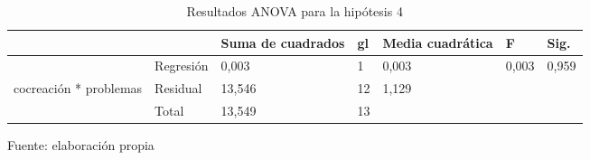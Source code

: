 \begin{table}[h]
    \caption {Resultados ANOVA para la hipótesis 4}
	\label{tab:anovaH4}
	\setlength\extrarowheight{5pt}
	
	\begin{tabular}{p{2.1cm} p{3.1cm} p{1.8cm} p{0.9cm} p{1.8cm} p{0.9cm} p{2.0cm}}
	\toprule
			&						& Suma de cuadrados	& gl	& Media cuadrática	& F	& Sig. \\
	\midrule
			& Regresión						& 0,003		& 1		& 0,003	& 0,003	& 0,959 \\
	cocreación * problemas	& Residual	& 13,546	& 12	& 1,129	&	& \\
			& Total							& 13,549	& 13 \\
	\bottomrule
	\end{tabular}
	
	\center
	\footnotesize
	Fuente: elaboración propia
\end{table}
